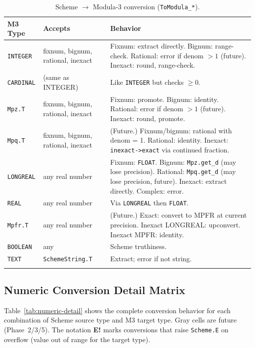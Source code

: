 \documentclass[12pt]{article}
\begin{document}
\begin{longtable}{lp{3cm}p{6.5cm}}
\toprule
\textbf{M3 Type} & \textbf{Accepts} & \textbf{Behavior} \\
\midrule
\endhead
{\tt INTEGER} &
  fixnum, bignum, rational, inexact &
  Fixnum: extract directly.
  Bignum: range-check.
  Rational: error if denom $> 1$ (future).
  Inexact: round, range-check. \\[6pt]
{\tt CARDINAL} &
  (same as INTEGER) &
  Like {\tt INTEGER} but checks $\geq 0$. \\[6pt]
{\tt Mpz.T} &
  fixnum, bignum, rational, inexact &
  Fixnum: promote.
  Bignum: identity.
  Rational: error if denom $> 1$ (future).
  Inexact: round, promote. \\[6pt]
{\tt Mpq.T} &
  fixnum, bignum, rational, inexact &
  (Future.)
  Fixnum/bignum: rational with denom = 1.
  Rational: identity.
  Inexact: {\tt inexact->exact} via continued fraction. \\[6pt]
{\tt LONGREAL} &
  any real number &
  Fixnum: {\tt FLOAT}.
  Bignum: {\tt Mpz.get\_d} (may lose precision).
  Rational: {\tt Mpq.get\_d} (may lose precision, future).
  Inexact: extract directly.
  Complex: error. \\[6pt]
{\tt REAL} &
  any real number &
  Via {\tt LONGREAL} then {\tt FLOAT}. \\[6pt]
{\tt Mpfr.T} &
  any real number &
  (Future.)
  Exact: convert to MPFR at current precision.
  Inexact LONGREAL: upconvert.
  Inexact MPFR: identity. \\[6pt]
{\tt BOOLEAN} &
  any &
  Scheme truthiness. \\[6pt]
{\tt TEXT} &
  {\tt SchemeString.T} &
  Extract; error if not string. \\[6pt]
\bottomrule
\caption{Scheme $\to$ Modula-3 conversion ({\tt ToModula\_*}).}
\label{tab:scheme-to-m3}
\end{longtable}

\subsection{Numeric Conversion Detail Matrix}
\label{sec:numeric-matrix}

Table~\ref{tab:numeric-detail} shows the complete conversion
behavior for each combination of Scheme source type and M3 target
type.  Gray cells are future (Phase~2/3/5).  The notation
\textbf{E!} marks conversions that raise {\tt Scheme.E} on
overflow (value out of range for the target type).
\end{document}

